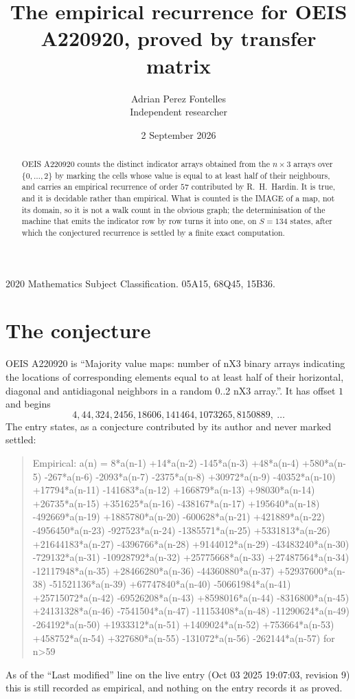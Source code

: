 \documentclass[11pt,a4paper]{article}
\title{The empirical recurrence for OEIS A220920, proved by transfer matrix}
\author{Adrian Perez Fontelles\\ \small Independent researcher}
\date{2 September 2026}
\theoremstyle{plain}
\theoremstyle{definition}
\begin{document}
\maketitle

\begin{abstract}
OEIS A220920 counts the distinct indicator arrays obtained from the $n\times3$ arrays over
$\{0,\dots,2\}$ by marking the cells whose value is equal to at least half of their neighbours, and carries an
empirical recurrence of order $57$ contributed by R.~H.~Hardin. It is true, and it is
decidable rather than empirical. What is counted is the IMAGE of a map, not its domain, so it
is not a walk count in the obvious graph; the determinisation of the machine that emits the
indicator row by row turns it into one, on $S=134$ states, after which the conjectured
recurrence is settled by a finite exact computation.
\end{abstract}

\noindent\small 2020 Mathematics Subject Classification. 05A15, 68Q45, 15B36.\normalsize

\section{The conjecture}

OEIS A220920 is ``Majority value maps: number of nX3 binary arrays indicating the locations of corresponding elements equal to at least half of their horizontal, diagonal and antidiagonal neighbors in a random 0..2 nX3 array.''. It has offset $1$ and begins
\[
4, 44, 324, 2456, 18606, 141464, 1073265, 8150889,\ \dots
\]
The entry states, as a conjecture contributed by its author and never marked settled:
\begin{quote}
Empirical: a(n) = 8*a(n-1) +14*a(n-2) -145*a(n-3) +48*a(n-4) +580*a(n-5) -267*a(n-6) -2093*a(n-7) -2375*a(n-8) +30972*a(n-9) -40352*a(n-10) +17794*a(n-11) -141683*a(n-12) +166879*a(n-13) +98030*a(n-14) +26735*a(n-15) +351625*a(n-16) -438167*a(n-17) +195640*a(n-18) -492669*a(n-19) +1885780*a(n-20) -600628*a(n-21) +421889*a(n-22) -4956450*a(n-23) -927523*a(n-24) -1385571*a(n-25) +5331813*a(n-26) +21644183*a(n-27) -4396766*a(n-28) +9144012*a(n-29) -43483240*a(n-30) -729132*a(n-31) -10928792*a(n-32) +25775668*a(n-33) +27487564*a(n-34) -12117948*a(n-35) +28466280*a(n-36) -44360880*a(n-37) +52937600*a(n-38) -51521136*a(n-39) +67747840*a(n-40) -50661984*a(n-41) +25715072*a(n-42) -69526208*a(n-43) +8598016*a(n-44) -8316800*a(n-45) +24131328*a(n-46) -7541504*a(n-47) -11153408*a(n-48) -11290624*a(n-49) -264192*a(n-50) +1933312*a(n-51) +1409024*a(n-52) +753664*a(n-53) +458752*a(n-54) +327680*a(n-55) -131072*a(n-56) -262144*a(n-57) for n>59
\end{quote}
As of the ``Last modified'' line on the live entry (Oct 03 2025 19:07:03, revision 9) this is still
recorded as empirical, and nothing on the entry records it as proved.
\end{document}
